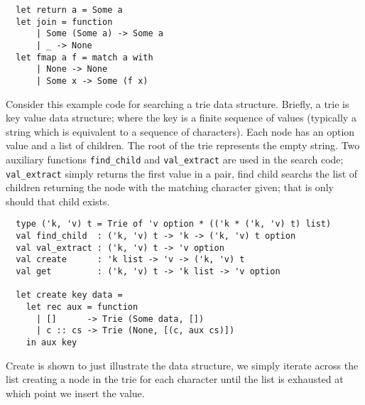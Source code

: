 \begin{verbatim}
  let return a = Some a
  let join = function
      | Some (Some a) -> Some a
      | _ -> None
  let fmap a f = match a with
      | None -> None
      | Some x -> Some (f x)
\end{verbatim}

Consider this example code for searching a trie data structure.
Briefly, a trie is key value data structure;
where the key is a finite sequence of values
(typically a string which is equivalent to a sequence of characters).
Each node has an option value and a list of children.
The root of the trie represents the empty string.
Two auxiliary functions \texttt{find\_child} and \texttt{val\_extract}
are used in the search code; \texttt{val\_extract}
simply returns the first value in a pair,
find child searchs the list of children returning
the node with the matching character given;
that is only should that child exists.

\begin{verbatim}
  type ('k, 'v) t = Trie of 'v option * (('k * ('k, 'v) t) list)
  val find_child  : ('k, 'v) t -> 'k -> ('k, 'v) t option
  val val_extract : ('k, 'v) t -> 'v option
  val create      : 'k list -> 'v -> ('k, 'v) t
  val get         : ('k, 'v) t -> 'k list -> 'v option

  let create key data =
    let rec aux = function
      | []      -> Trie (Some data, [])
      | c :: cs -> Trie (None, [(c, aux cs)])
    in aux key
\end{verbatim}

Create is shown to just illustrate the data structure,
we simply iterate across the list creating a node in the trie for each character
until the list is exhausted at which point we insert the value.

